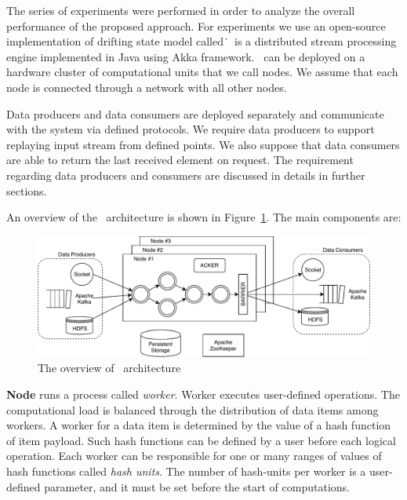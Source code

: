 
\label {fs-experiments-seciton}

The series of experiments were performed in order to analyze the overall performance of the proposed approach. For experiments we use an open-source implementation of drifting state model called~\FlameStream\. \FlameStream\ is a distributed stream processing engine implemented in Java using Akka framework. \FlameStream\ can be deployed on a hardware cluster of computational units that we call nodes. We assume that each node is connected through a network with all other nodes.

Data producers and data consumers are deployed separately and communicate with the system via defined protocols. We require data producers to support replaying input stream from defined points. We also suppose that data consumers are able to return the last received element on request. The requirement regarding data producers and consumers are discussed in details in further sections.

An overview of the \FlameStream\ architecture is shown in Figure~\ref{arch}. The main components are:

\begin{figure}[htbp]
  \centering
  \includegraphics[scale=0.78]{pics/arch}
  \caption{The overview of \FlameStream\ architecture}
  \label {arch}
\end{figure}

{\bf Node} runs a process called {\it worker}. Worker executes user-defined operations. The computational load is balanced through the distribution of data items among workers. A worker for a data item is determined by the value of a hash function of item payload. Such hash functions can be defined by a user before each logical operation. Each worker can be responsible for one or many ranges of values of hash functions called {\it hash units}. The number of hash-units per worker is a user-defined parameter, and it must be set before the start of computations. 


